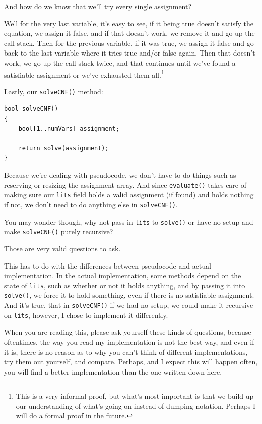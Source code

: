 And how do we know that we'll try every single assignment?

Well for the very last variable, it's easy to see, if it being true doesn't satisfy
the equation, we assign it false, and if that doesn't work, we remove it and go
up the call stack. Then for the previous variable, if it was true, we assign it
false and go back to the last variable where it tries true and/or false again.
Then that doesn't work, we go up the call stack twice, and that continues until
we've found a satisfiable assignment or we've exhausted them all.\footnote{
This is a very informal proof, but what's most important is that we build up
our understanding of what's going on instead of dumping notation. Perhaps I
will do a formal proof in the future.}

Lastly, our \texttt{solveCNF()} method:

\begin{lstlisting}
bool solveCNF()
{
    bool[1..numVars] assignment;

    return solve(assignment);
}
\end{lstlisting}

Because we're dealing with pseudocode, we don't have to do things such as
reserving or resizing the assignment array. And since \texttt{evaluate()} takes
care of making sure our \texttt{lits} field holds a valid assignment (if found)
and holds nothing if not, we don't need to do anything else in
\texttt{solveCNF()}.

You may wonder though, why not pass in \texttt{lits} to \texttt{solve()} or
have no setup and make \texttt{solveCNF()} purely recursive?

Those are very valid questions to ask.

This has to do with the differences between pseudocode and actual
implementation. In the actual implementation, some methods depend on the
state of \texttt{lits}, such as whether or not it holds anything, and by passing
it into \texttt{solve()}, we force it to hold something, even if there is no
satisfiable assignment. And it's true, that in \texttt{solveCNF()} if we had no
setup, we could make it recursive on \texttt{lits}, however, I chose to
implement it differently.

When you are reading this, please ask yourself these kinds of questions,
because oftentimes, the way you read my implementation is not the best way,
and even if it is, there is no reason as to why you can't think of different
implementations, try them out yourself, and compare. Perhaps, and I expect
this will happen often, you will find a better implementation than the one
written down here.

